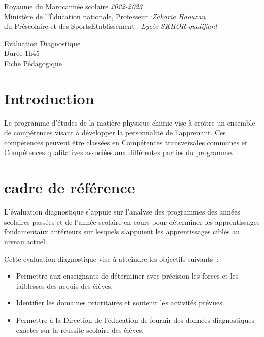 \documentclass[12pt]{article}
\newcommand\headerMe[2]{\noindent{}#1\hfill#2}
\begin{document}
\headerMe{Royaume du Maroc}{année scolaire \emph{2022-2023}}\\
\headerMe{Ministère de l'Éducation nationale, }{  Professeur :\emph{Zakaria Haouzan}}\\
\headerMe{du Préscolaire et des Sports}{Établissement : \emph{Lycée SKHOR qualifiant}}\\

\begin{center}
Evaluation Diagnostique \\
Durée 1h45
\\
    \vspace{.2cm}
\hrulefill
\Large{Fiche Pédagogique}
\hrulefill\\
\end{center}


\section[A]{Introduction }
\hspace{0.5cm}Le programme d'études de la matière physique chimie vise à croître un ensemble de compétences visant à développer la personnalité de l'apprenant. Ces compétences peuvent être classées en Compétences transversales communes et Compétences qualitatives associées aux différentes parties du programme.
\section{cadre de référence }
 \hspace{0.5cm}
L'évaluation diagnostique s'appuie sur l'analyse des programmes des années scolaires passées et de l'année scolaire en cours pour déterminer les apprentissages fondamentaux antérieurs sur lesquels s'appuient les apprentissages ciblés au niveau actuel.

Cette évaluation diagnostique vise à atteindre les objectifs suivants :
\begin{itemize}
	\item Permettre aux enseignants de déterminer avec précision les forces et les faiblesses des acquis des élèves.
	\item Identifier les domaines prioritaires et soutenir les activités prévues.
	\item Permettre à la Direction de l'éducation de fournir des données diagnostiques exactes sur la réussite scolaire des élèves.
\end{itemize}
\end{document}
